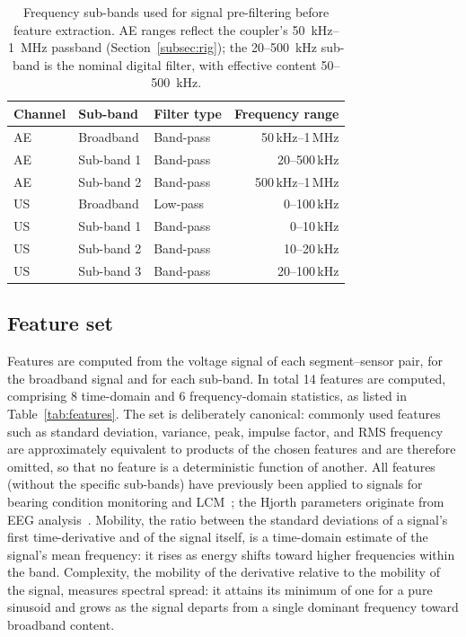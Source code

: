 \begin{table}[htbp]
\centering
{\small{}%
\begin{tabular}{@{} l l l r @{}}
\toprule
\textbf{Channel} & \textbf{Sub-band} & \textbf{Filter type} & \textbf{Frequency range} \\
\midrule
AE & Broadband  & Band-pass       & 50\,kHz--1\,MHz        \\
AE & Sub-band 1 & Band-pass & 20--500\,kHz     \\
AE & Sub-band 2 & Band-pass & 500\,kHz--1\,MHz \\
US & Broadband  & Low-pass  & 0--100\,kHz      \\
US & Sub-band 1 & Band-pass & 0--10\,kHz       \\
US & Sub-band 2 & Band-pass & 10--20\,kHz      \\
US & Sub-band 3 & Band-pass & 20--100\,kHz     \\
\bottomrule
\end{tabular}}
\caption{Frequency sub-bands used for signal pre-filtering before feature extraction. AE ranges reflect the coupler's \SI{50}{kHz}--\SI{1}{MHz} passband (Section~\ref{subsec:rig}); the 20--500~kHz sub-band is the nominal digital filter, with effective content 50--500~kHz.}
\label{tab:subbands}
\end{table}

\subsection{Feature set}
\label{subsec:features_extract}

Features are computed from the voltage signal of each segment--sensor pair, for the broadband signal and for each sub-band. In total 14 features are computed, comprising 8 time-domain and 6 frequency-domain statistics, as listed in Table~\ref{tab:features}. The set is deliberately canonical: commonly used features such as standard deviation, variance, peak, impulse factor, and RMS frequency are approximately equivalent to products of the chosen features and are therefore omitted, so that no feature is a deterministic function of another. All features (without the specific sub-bands) have previously been applied to signals for bearing condition monitoring and LCM~\cite{jakobsen_detecting_2023,zhang_graph_2024}; the Hjorth parameters originate from EEG analysis~\cite{hjorth_eeg_1970}. Mobility, the ratio between the standard deviations of a signal's first time-derivative and of the signal itself, is a time-domain estimate of the signal's mean frequency: it rises as energy shifts toward higher frequencies within the band. Complexity, the mobility of the derivative relative to the mobility of the signal, measures spectral spread: it attains its minimum of one for a pure sinusoid and grows as the signal departs from a single dominant frequency toward broadband content.

